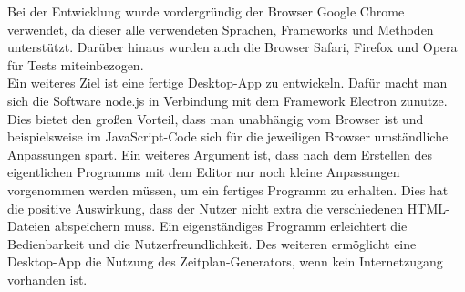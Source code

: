 Bei der Entwicklung wurde vordergründig der Browser Google Chrome verwendet, da dieser alle verwendeten Sprachen, Frameworks und Methoden unterstützt. Darüber hinaus wurden auch die Browser Safari, Firefox und Opera für Tests miteinbezogen.\\
Ein weiteres Ziel ist eine fertige Desktop-App zu entwickeln. Dafür macht man sich die Software node.js in Verbindung mit dem Framework Electron zunutze. Dies bietet den großen Vorteil, dass man unabhängig vom Browser ist und beispielsweise im JavaScript-Code sich für die jeweiligen Browser umständliche Anpassungen spart. Ein weiteres Argument ist, dass nach dem Erstellen des eigentlichen Programms mit dem Editor nur noch kleine Anpassungen vorgenommen werden müssen, um ein fertiges Programm zu erhalten. Dies hat die positive Auswirkung, dass der Nutzer nicht extra die verschiedenen HTML-Dateien abspeichern muss. Ein eigenständiges Programm erleichtert die Bedienbarkeit und die Nutzerfreundlichkeit. Des weiteren ermöglicht eine Desktop-App die Nutzung des Zeitplan-Generators, wenn kein Internetzugang vorhanden ist. \\
